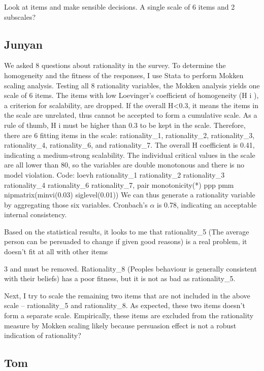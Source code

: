 \documentclass[
  ,jou,floatsintext]{apa6}
\begin{document}
Look at items and make sensible decisions. A single scale of 6 items and 2 subscales?

\hypertarget{junyan}{%
\subsection{Junyan}\label{junyan}}

We asked 8 questions about rationality in the survey. To determine the homogeneity and the
fitness of the responses, I use Stata to perform Mokken scaling analysis. Testing all 8
rationality variables, the Mokken analysis yields one scale of 6 items. The items with low
Loevinger's coefficient of homogeneity (H i ), a criterion for scalability, are dropped. If the
overall H\textless0.3, it means the items in the scale are unrelated, thus cannot be accepted to form a
cumulative scale. As a rule of thumb, H i must be higher than 0.3 to be kept in the scale.
Therefore, there are 6 fitting items in the scale: rationality\_1, rationality\_2, rationality\_3,
rationality\_4, rationality\_6, and rationality\_7. The overall H coefficient is 0.41, indicating a
medium-strong scalability. The individual critical values in the scale are all lower than 80, so
the variables are double monotonous and there is no model violation.
Code: loevh rationality\_1 rationality\_2 rationality\_3 rationality\_4 rationality\_6 rationality\_7,
pair monotonicity(*) ppp pmm nipmatrix(minvi(0.03) siglevel(0.01))
We can thus generate a rationality variable by aggregating those six variables. Cronbach's \(\alpha\)
is 0.78, indicating an acceptable internal consistency.

Based on the statistical results, it looks to me that rationality\_5 (The average person can be
persuaded to change if given good reasons) is a real problem, it doesn't fit at all with other items

3
and must be removed. Rationality\_8 (People\textquotesingle s behaviour is generally consistent with their beliefs)
has a poor fitness, but it is not as bad as rationality\_5.

Next, I try to scale the remaining two items that are not included in the above scale --
rationality\_5 and rationality\_8. As expected, these two items doesn't form a separate scale.
Empirically, these items are excluded from the rationality measure by Mokken scaling likely
because persuasion effect is not a robust indication of rationality?

\hypertarget{tom}{%
\subsection{Tom}\label{tom}}
\end{document}
